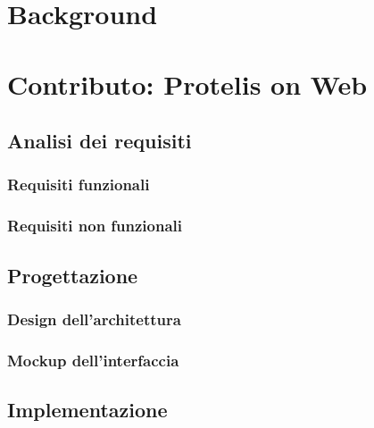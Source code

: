 \documentclass[%
  a4paper,                %
  fontsize=12pt,          %
  twoside,                %
  openany,              %
  titlepage,              %
  final                   %
  headings=standardclasses, %
  headings=big,             %
  chapterprefix=false       %
]{scrbook}
\begin{document}
  \frontmatter{}

  
  
  
  

  \tableofcontents

  \mainmatter{}

  

  \part{Background}\label{part:background}
    
    
    

  \part{Contributo: Protelis on Web}\label{part:contribution}
    \chapter{Analisi dei requisiti}\label{ch:requirements}
      \section{Requisiti funzionali}
      \section{Requisiti non funzionali}
    \chapter{Progettazione}
      \section{Design dell'architettura}
      \section{Mockup dell'interfaccia}
    \chapter{Implementazione}
\end{document}
